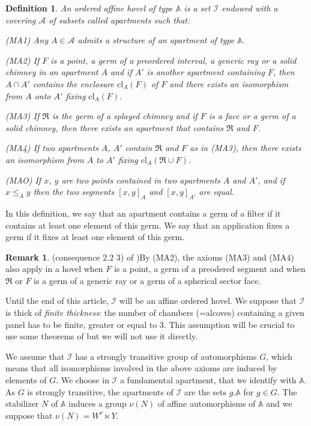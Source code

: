 \documentclass[12pt]{article}
\theoremstyle{plain}
\newtheorem{definition}[theorem]{Definition}
\theoremstyle{definition}
\newtheorem{rque}[theorem]{Remark}
\newcommand{\A}{\mathbb{A}}
\newcommand{\I}{\mathcal{I}}
\begin{document}
\begin{definition}
An ordered affine hovel of type $\A$ is a set $\mathcal{I}$ endowed with a covering $\mathcal{A}$ of subsets called apartments such that: 

(MA1) Any $A\in \mathcal{A}$ admits a structure of an apartment of type $\A$.

(MA2) If $F$ is a point, a germ of a preordered interval, a generic ray or a solid chimney in an apartment $A$ and if $A'$ is another apartment containing $F$, then $A\cap A'$ contains the enclosure $\mathrm{cl}_A(F)$ of $F$ and there exists an isomorphism from $A$ onto $A'$ fixing $\mathrm{cl}_A(F)$.

(MA3) If $\mathfrak{R}$ is the germ of a splayed chimney and if $F$ is a face or a germ of a solid chimney, then there exists an apartment that contains $\mathfrak{R}$ and $F$.

(MA4) If two apartments $A$, $A'$ contain $\mathfrak{R}$ and $F$ as in (MA3), then there exists an isomorphism from $A$ to $A'$ fixing $\mathrm{cl}_A(\mathfrak{R}\cup F)$.

(MAO) If $x$, $y$ are two points contained in two apartments $A$ and $A'$, and if $x\leq_{A} y$ then the two segments $[x,y]_A$ and $[x,y]_{A'}$ are equal.
\end{definition}


In this definition, we say that an apartment contains a germ of a filter if it contains at least one element of this germ. We say that an application fixes a germ if it fixes at least one element of this germ.

\begin{rque}(consequence 2.2 3) of \cite{rousseau2011masures})\label{rque axioms MA3 et MA4 modifiés}
By (MA2), the axioms (MA3) and (MA4) also apply in a hovel when $F$ is a point, a germ of a preodered segment and when $\mathfrak{R}$ or $F$ is a germ of a generic ray or a germ of a spherical sector face.
\end{rque}

\medskip
Until the end of this article, $\I$ will be an affine ordered hovel. We suppose that $\I$ is thick of \textit{finite thickness}: the number of chambers (=alcoves) containing a given panel has to be finite, greater or equal to $3$. This assumption will be crucial to use some theorems of \cite{gaussent2014spherical} but we will not use it directly. 

We assume that $\I$ has a strongly transitive group of automorphisms $G$, which means that all isomorphisms involved in the above axioms are induced by elements of $G$. We choose in $\I$ a fundamental apartment, that we identify with $\A$. As $G$ is strongly transitive, the apartments of $\I$ are the sets $g.\A$ for $g\in G$. The stabilizer $N$ of $\A$ induces a group $\nu(N)$ of affine automorphisms of $\A$ and we suppose that $\nu(N)=W^v\ltimes Y$.
\end{document}
